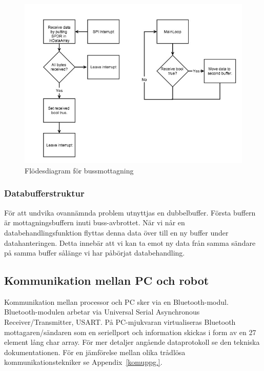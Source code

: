 \documentclass[a4paper,12pt,fleqn]{article}
\begin{document}
\begin{figure}[htp] %
  \begin{center}
  \includegraphics[keepaspectratio=true,scale=0.5]{spirec.jpg}  %
  \end{center}
  \caption{Flödesdiagram för bussmottagning} %
  \label{fig:SPIrec}
\end{figure}


\subsubsection{Databufferstruktur}
För att undvika ovannämnda problem utnyttjas en dubbelbuffer. Första buffern är mottagningsbuffern inuti buss-avbrottet. När vi når en databehandlingsfunktion flyttas denna data över till en ny buffer under datahanteringen. Detta innebär att vi kan ta emot ny data från samma sändare på samma buffer sålänge vi har påbörjat databehandling.

\subsection{Kommunikation mellan PC och robot}
Kommunikation mellan processor och PC sker via en Bluetooth-modul. Bluetooth-modulen arbetar via Universal Serial Asynchronous Receiver/Transmitter, USART.
På PC-mjukvaran virtualiseras Bluetooth mottagaren/sändaren som en seriellport och information skickas i form av en 27 element lång char array. För mer detaljer angående dataprotokoll se den tekniska dokumentationen. För en jämförelse mellan olika trådlösa kommunikationstekniker se Appendix~\ref{komuppg.}.
\end{document}
